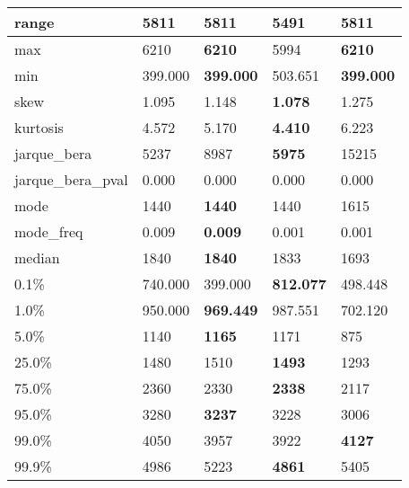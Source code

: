 \begin{table}[H]
\begin{tabular}{|l|m{10em}|m{10em}|m{10em}|m{10em}|}
\hline range & 5811 & \bfseries 5811 & \cellcolor[rgb]{0.9, 0.54, 0.52} 5491 & \bfseries 5811 \\
\hline max & 6210 & \bfseries 6210 & \cellcolor[rgb]{0.9, 0.54, 0.52} 5994 & \bfseries 6210 \\
\hline min & 399.000 & \bfseries 399.000 & \cellcolor[rgb]{0.9, 0.54, 0.52} 503.651 & \bfseries 399.000 \\
\hline skew & 1.095 & 1.148 & \bfseries 1.078 & \cellcolor[rgb]{0.9, 0.54, 0.52} 1.275 \\
\hline kurtosis & 4.572 & 5.170 & \bfseries 4.410 & \cellcolor[rgb]{0.9, 0.54, 0.52} 6.223 \\
\hline jarque\_bera & 5237 & 8987 & \bfseries 5975 & \cellcolor[rgb]{0.9, 0.54, 0.52} 15215 \\
\hline jarque\_bera\_pval & 0.000 & 0.000 & 0.000 & 0.000 \\
\hline mode & 1440 & \bfseries 1440 & 1440 & \cellcolor[rgb]{0.9, 0.54, 0.52} 1615 \\
\hline mode\_freq & 0.009 & \bfseries 0.009 & \cellcolor[rgb]{0.9, 0.54, 0.52} 0.001 & 0.001 \\
\hline median & 1840 & \bfseries 1840 & 1833 & \cellcolor[rgb]{0.9, 0.54, 0.52} 1693 \\
\hline 0.1\% & 740.000 & \cellcolor[rgb]{0.9, 0.54, 0.52} 399.000 & \bfseries 812.077 & 498.448 \\
\hline 1.0\% & 950.000 & \bfseries 969.449 & 987.551 & \cellcolor[rgb]{0.9, 0.54, 0.52} 702.120 \\
\hline 5.0\% & 1140 & \bfseries 1165 & 1171 & \cellcolor[rgb]{0.9, 0.54, 0.52} 875 \\
\hline 25.0\% & 1480 & 1510 & \bfseries 1493 & \cellcolor[rgb]{0.9, 0.54, 0.52} 1293 \\
\hline 75.0\% & 2360 & 2330 & \bfseries 2338 & \cellcolor[rgb]{0.9, 0.54, 0.52} 2117 \\
\hline 95.0\% & 3280 & \bfseries 3237 & 3228 & \cellcolor[rgb]{0.9, 0.54, 0.52} 3006 \\
\hline 99.0\% & 4050 & 3957 & \cellcolor[rgb]{0.9, 0.54, 0.52} 3922 & \bfseries 4127 \\
\hline 99.9\% & 4986 & 5223 & \bfseries 4861 & \cellcolor[rgb]{0.9, 0.54, 0.52} 5405 \\
\hline
\end{tabular}
\end{table}
